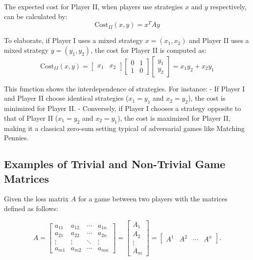 \documentclass[11pt]{article}
\theoremstyle{boldStyle}
\begin{document}
The expected cost for Player II, when players use strategies \( x \) and \( y \) respectively, can be calculated by:
\begin{equation*} \label{eq:expected_cost}
    \text{Cost}_{II}(x, y) = x^T A y
\end{equation*}

To elaborate, if Player I uses a mixed strategy \( x = (x_1, x_2) \) and Player II uses a mixed strategy \( y = (y_1, y_2) \), the cost for Player II is computed as:
\begin{equation*}
    \text{Cost}_{II}(x, y) = \begin{bmatrix} x_1 & x_2 \end{bmatrix} \begin{bmatrix} 0 & 1 \\ 1 & 0 \end{bmatrix} \begin{bmatrix} y_1 \\ y_2 \end{bmatrix} = x_1 y_2 + x_2 y_1
\end{equation*}

This function shows the interdependence of strategies. For instance:
- If Player I and Player II choose identical strategies (\( x_1 = y_1 \) and \( x_2 = y_2 \)), the cost is minimized for Player II.
- Conversely, if Player I chooses a strategy opposite to that of Player II (\( x_1 = y_2 \) and \( x_2 = y_1 \)), the cost is maximized for Player II, making it a classical zero-sum setting typical of adversarial games like Matching Pennies.


\subsection{Examples of Trivial and Non-Trivial Game Matrices}

Given the loss matrix \( A \) for a game between two players with the matrices defined as follows:

\begin{equation*} \label{eq:3}
    A = \begin{bmatrix}
    a_{11} & a_{12} & \cdots & a_{1n} \\
    a_{21} & a_{22} & \cdots & a_{2n} \\
    \vdots & \vdots & \ddots & \vdots \\
    a_{m1} & a_{m2} & \cdots & a_{mn}
    \end{bmatrix} = \begin{bmatrix} A_1 \\ A_2 \\ \vdots \\ A_m \end{bmatrix} = \begin{bmatrix} A^1 & A^2 & \cdots & A^n \end{bmatrix}.
\end{equation*}
\end{document}
